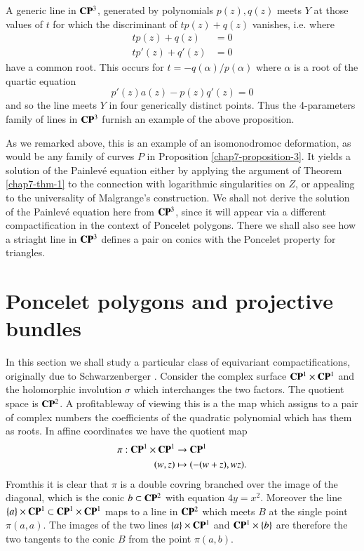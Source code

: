 \begin{example*}
\begin{enumerate}[]
A generic line in $\mathbf{C}\mathbf{P}^{3}$, generated by polynomials $p(z), q(z)$ meets $Y$ at those values of $t$ for which the discriminant of $tp(z) + q(z)$ vanishes, i.e. where
\begin{align*}
tp(z) +q(z) &= 0\\
tp'(z)+q'(z) &= 0
\end{align*}
have a common root. This occurs for $t = -q(\alpha)/p(\alpha)$ where $\alpha$ is a root of the quartic equation
$$
p'(z)a(z)-p(z)q'(z) =0
$$
and so the line meets $Y$ in four generically distinct points. Thus the 4-parameters family of lines in $\mathbf{C}\mathbf{P}^{3}$ furnish an example of the above proposition.
\end{enumerate}
As we remarked above, this is an example of an isomonodromoc deformation, as would be any family of curves $P$ in Proposition \ref{chap7-proposition-3}. It yields a solution of the Painlev\'e equation either by applying the argument of Theorem \ref{chap7-thm-1} to the connection with logarithmic singularities on $Z$, or appealing to the universality of Malgrange's construction. We shall not derive the solution of the Painlev\'e equation here from $\mathbf{C}\mathbf{P}^{3}$, since it will appear via a different compactification in the context of Poncelet polygons. There we shall also see how a striaght line in $\mathbf{C}\mathbf{P}^{3}$ defines a pair on conics with the Poncelet property for triangles.
\end{example*}

\section{Poncelet polygons and projective bundles}\label{chap7-sec-4}

In this section we shall study a particular class of equivariant compactifications, originally due to Schwarzenberger \cite{chap7-key16}. Consider the complex surface $\mathbf{C}\mathbf{P}^{1}\times \mathbf{C}\mathbf{P}^{1}$ and the holomorphic involution $\sigma$ which interchanges the two factors. The quotient space is $\mathbf{C}\mathbf{P}^{2}$. A profitableway of viewing this is a the map which assigns to a pair of complex numbers the coefficients of the quadratic polynomial which has them as roots. In affine coordinates we have the quotient map
\begin{align*}
\pi : \mathbf{C}\mathbf{P}^{1} \times \mathbf{C}\mathbf{P}^{1} &\rightarrow \mathbf{C}\mathbf{P}^{1}\\
(w, z) &\mapsto (-(w +z), wz).
\end{align*}
From\pageoriginale this it is clear that $\pi$ is a double covring branched over the image of the diagonal, which is the
conic $b\subset \mathbf{C}\mathbf{P}^{2}$ with equation $4y =x^{2}$. Moreover the line $\{a\} \times \mathbf{C}\mathbf{P}^{1} \subset \mathbf{C}\mathbf{P}^{1} \times \mathbf{C}\mathbf{P}^{1}$ maps to a line in $\mathbf{C}\mathbf{P}^{2}$ which meets $B$ at the single point $\pi(a, a)$. The images of the two lines  $\{a\} \times \mathbf{C}\mathbf{P}^{1}$ and $\mathbf{C}\mathbf{P}^{1} \times \{b\}$ are therefore the two tangents to the conic $B$ from the point $\pi(a, b)$.

